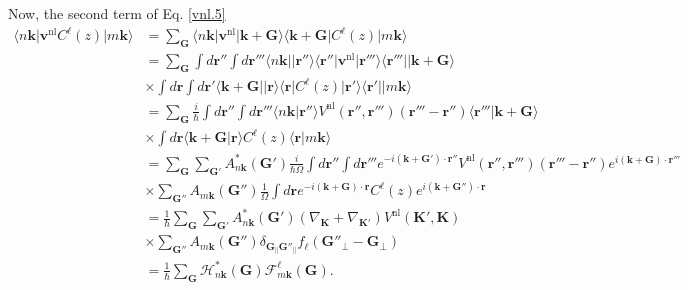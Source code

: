 Now, the second term of Eq. \eqref{vnl.5}
\begin{align}\label{vnl.12}
\langle n\mathbf{k}\vert 
\mathbf{v}^\mathrm{nl}
C^{\ell}(z) \vert m\mathbf{k}\rangle
&=\sum_{\mathbf{G}}
\langle n\mathbf{k}\vert 
\mathbf{v}^\mathrm{nl} 
\vert\mathbf{k}+\mathbf{G}\rangle
\langle\mathbf{k}+\mathbf{G}\vert C^{\ell}(z)
\vert m\mathbf{k}\rangle
\nonumber\\
&=\sum_{\mathbf{G}}
\int d\mathbf{r}'' 
\int d\mathbf{r}''' 
\langle n\mathbf{k}\vert 
\vert\mathbf{r}''\rangle\langle\mathbf{r}''\vert 
\mathbf{v}^\mathrm{nl} 
\vert\mathbf{r}'''\rangle\langle\mathbf{r}'''\vert
\vert\mathbf{k}+\mathbf{G}\rangle
\nonumber\\
&\times 
\int d\mathbf{r} 
\int d\mathbf{r}' 
\langle\mathbf{k}+\mathbf{G}\vert
\vert\mathbf{r}\rangle\langle\mathbf{r}\vert  
C^{\ell}(z) 
\vert\mathbf{r}'\rangle\langle\mathbf{r}'\vert
\vert m\mathbf{k}\rangle
\nonumber\\
&=\sum_{\mathbf{G}}
\frac{i}{\hbar}
\int d\mathbf{r}'' 
\int d\mathbf{r}''' 
\langle n\mathbf{k}\vert\mathbf{r}''\rangle
V^\mathrm{nl}(\mathbf{r}'',\mathbf{r}''')(\mathbf{r}'''-\mathbf{r}'') 
\langle\mathbf{r}'''\vert\mathbf{k}+\mathbf{G}\rangle
\nonumber\\
&\times 
\int d\mathbf{r} 
\langle\mathbf{k}+\mathbf{G}\vert\mathbf{r}\rangle
C^{\ell}(z) 
\langle\mathbf{r}\vert m\mathbf{k}\rangle
\nonumber\\
&=\sum_{\mathbf{G}}
\sum_{\mathbf{G}'}
A^{*}_{n\mathbf{k}}(\mathbf{G}') 
\frac{i}{\hbar\Omega}
\int d\mathbf{r}'' 
\int d\mathbf{r}''' 
e^{-i(\mathbf{k}+\mathbf{G}')\cdot\mathbf{r}''} 
V^\mathrm{nl}(\mathbf{r}'',\mathbf{r}''')(\mathbf{r}'''-\mathbf{r}'') 
e^{i(\mathbf{k}+\mathbf{G})\cdot\mathbf{r}'''}
\nonumber\\
&\times 
\sum_{\mathbf{G}''}
A_{m\mathbf{k}}(\mathbf{G}'') 
\frac{1}{\Omega}
\int d\mathbf{r} 
e^{-i(\mathbf{k}+\mathbf{G})\cdot\mathbf{r}} 
C^{\ell}(z) 
e^{i(\mathbf{k}+\mathbf{G}'')\cdot\mathbf{r}}
\nonumber\\
&=
\frac{1}{\hbar}
\sum_{\mathbf{G}}
\sum_{\mathbf{G}'}
A^{*}_{n\mathbf{k}}(\mathbf{G}') 
(\nabla_\mathbf{K}+\nabla_{\mathbf{K}'})
V^\mathrm{nl}(\mathbf{K}',\mathbf{K})
\nonumber\\
&\times 
\sum_{\mathbf{G}''}
A_{m\mathbf{k}}(\mathbf{G}'') 
\delta_{\mathbf{G}_\parallel \mathbf{G}''_\parallel}f_\ell(\mathbf{G}''_\perp-\mathbf{G}_\perp)
\nonumber\\
&=
\frac{1}{\hbar}
\sum_{\mathbf{G}}
\mathcal{H}^{*}_{n\mathbf{k}}(\mathbf{G}) 
\mathcal{F}^{\ell}_{m\mathbf{k}}(\mathbf{G}) 
.
\end{align}
